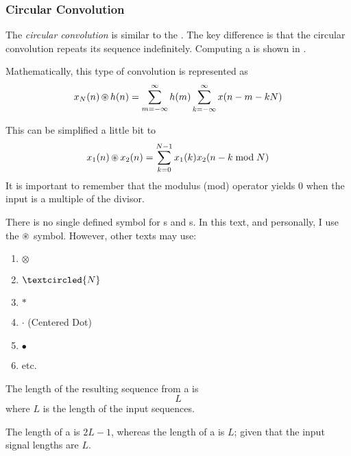 \subsubsection{Circular Convolution}\label{subsubsec:DFT_Properties-Circular_Convolution}
\begin{definition}\label{def:Circular_Convolution}
  The \emph{circular convolution} is similar to the .
  The key difference is that the circular convolution repeats its sequence indefinitely.
  Computing a  is shown in .

  Mathematically, this type of convolution is represented as
  \begin{equation}\label{eq:Circular_Convolution}
    x_{N}(n) \operatorname{\circledast} h(n) = \sum\limits_{m=-\infty}^{\infty} h(m) \sum\limits_{k=-\infty}^{\infty} x(n-m-kN)
  \end{equation}

  This can be simplified a little bit to
  \begin{equation}\label{eq:Circular_Convolution-Simplified}
    x_{1}(n) \operatorname{\circledast} x_{2}(n) = \sum\limits_{k=0}^{N-1} x_{1}(k) x_{2}(n-k \bmod N)
  \end{equation}
  It is important to remember that the modulus (mod) operator yields 0 when the input is a multiple of the divisor.

  \begin{remark}
    There is no single defined symbol for s and s.
    In this text, and personally, I use the $\operatorname{\circledast}$ symbol.
    However, other texts may use:
    \begin{enumerate}[noitemsep]
    \item $\otimes$
    \item $\textcircled{N}$
    \item $*$
    \item $\cdot$ (Centered Dot)
    \item $\bullet$
    \item etc.
    \end{enumerate}
  \end{remark}
  
  \begin{remark}\label{rmk:Circular_Convolution_Length}
    The length of the resulting sequence from a  is
    \begin{equation}\label{eq:Circular_Convolution_Length}
      L
    \end{equation}
    where $L$ is the length of the input sequences.
  \end{remark}

  \begin{remark}
    The length of a  is $2L-1$, whereas the length of a  is $L$; given that the input signal lengths are $L$.
  \end{remark}
\end{definition}

